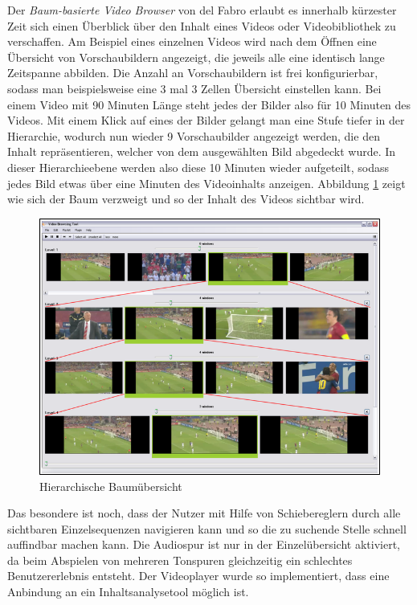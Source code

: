 \documentclass[11pt,a4paper]{report}
\begin{document}
Der \emph{Baum-basierte Video Browser} von del Fabro \cite{del2010instant} erlaubt es innerhalb kürzester Zeit sich einen Überblick über den Inhalt eines Videos oder Videobibliothek zu verschaffen. Am Beispiel eines einzelnen Videos wird nach dem Öffnen eine Übersicht von Vorschaubildern angezeigt, die jeweils alle eine identisch lange Zeitspanne abbilden. Die Anzahl an Vorschaubildern ist frei konfigurierbar, sodass man beispielsweise eine 3 mal 3 Zellen Übersicht einstellen kann. Bei einem Video mit 90 Minuten Länge steht jedes der Bilder also für 10 Minuten des Videos. Mit einem Klick auf eines der Bilder gelangt man eine Stufe tiefer in der Hierarchie, wodurch nun wieder 9 Vorschaubilder angezeigt werden, die den Inhalt repräsentieren, welcher von dem ausgewählten Bild abgedeckt wurde. In dieser Hierarchieebene werden also diese 10 Minuten wieder aufgeteilt, sodass jedes Bild etwas über eine Minuten des Videoinhalts anzeigen. Abbildung \ref{baum_browser} zeigt wie sich der Baum verzweigt und so der Inhalt des Videos sichtbar wird.
\begin{figure}[h]
\begin{center}
\includegraphics[scale=1.1]{./images/8.png}
\caption{Hierarchische Baumübersicht \cite{del2010instant}}
\label{baum_browser}
\end{center}
\end{figure}
Das besondere ist noch, dass der Nutzer mit Hilfe von Schiebereglern durch alle sichtbaren Einzelsequenzen navigieren kann und so die zu suchende Stelle schnell auffindbar machen kann. Die Audiospur ist nur in der Einzelübersicht aktiviert, da beim Abspielen von mehreren Tonspuren gleichzeitig ein schlechtes Benutzererlebnis entsteht. Der Videoplayer wurde so implementiert, dass eine Anbindung an ein Inhaltsanalysetool möglich ist.
\end{document}
